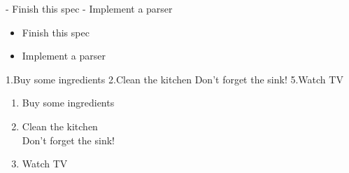 \begin{examples}
\begin{examplesource}
- Finish this spec
- Implement a parser
\end{examplesource}
  \begin{exampleoutput}
    \begin{minipage}{0.5\textwidth}
      \begin{itemize}[noitemsep]
      \item Finish this spec
      \item Implement a parser
      \end{itemize}
    \end{minipage}
  \end{exampleoutput}
\begin{examplesource}
1.Buy some ingredients
2.Clean the kitchen
  Don't forget the sink!
5.Watch TV
\end{examplesource}
  \begin{exampleoutput}
    \begin{minipage}{0.5\textwidth}
      \begin{enumerate}[noitemsep]
      \item Buy some ingredients
      \item Clean the kitchen\\Don't forget the sink!
        \setcounter{enumi}{4}
      \item Watch TV
      \end{enumerate}
    \end{minipage}
  \end{exampleoutput}
\end{examples}

